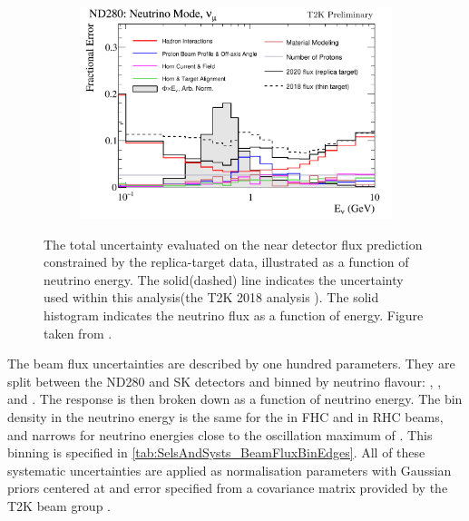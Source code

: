 \begin{figure}[h]
  \begin{subfigure}[t]{\textwidth}
    \includegraphics[width=\textwidth, trim={0mm 0mm 0mm 0mm}, clip,page=1]{Figures/Selections/flux_uncertainty_covariance_plots_addcorrnd_compwv3_flux_error_t2k_nd5_fhc_numu.pdf}
  \end{subfigure}
  \caption{The total uncertainty evaluated on the near detector \quickmath{\nu_{\mu}} flux prediction constrained by the replica-target data, illustrated as a function of neutrino energy. The solid(dashed) line indicates the uncertainty used within this analysis(the T2K 2018 analysis \cite{t2k_neutrino2018}). The solid histogram indicates the neutrino flux as a function of energy. Figure taken from \cite{t2k_tn_354}.}
  \label{fig:SelsAndSysts_BeamFluxSysts}
\end{figure}

The beam flux uncertainties are described by one hundred parameters. They are split between the ND280 and SK detectors and binned by neutrino flavour: \quickmath{\nu_{\mu}}, \quickmath{\bar{\nu}_{\mu}},  and . The response is then broken down as a function of neutrino energy. The bin density in the neutrino energy is the same for the \quickmath{\nu_{\mu}} in FHC and \quickmath{\bar{\nu}_{\mu}} in RHC beams, and narrows for neutrino energies close to the oscillation maximum of . This binning is specified in \autoref{tab:SelsAndSysts_BeamFluxBinEdges}. All of these systematic uncertainties are applied as normalisation parameters with Gaussian priors centered at  and error specified from a covariance matrix provided by the T2K beam group \cite{t2k_tn_354}.

